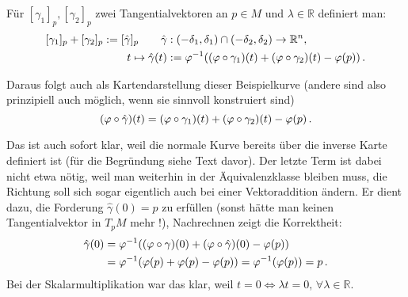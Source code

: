 \documentclass[../H_Analysis_main.tex]{subfiles}
\begin{document}
\begin{itemize}
\begin{defi}[Addition]
Für $[\gamma_1]_p, [\gamma_2]_p$ zwei Tangentialvektoren an $p \in M$ und $\lambda \in \mathbb{R}$ definiert man:
\begin{equation}
\begin{split}
[\gamma_1]_p + [\gamma_2]_p := [\hat{\gamma}]_p \qquad \hat{\gamma}&: (-\delta_1, \delta_1) \cap (-\delta_2, \delta_2) \rightarrow \mathbb{R}^n,
\\
t \mapsto \hat{\gamma}(t) &:= \varphi^{-1}\qty(\qty(\varphi \circ \gamma_1)(t) + \qty(\varphi \circ \gamma_2)(t) - \varphi(p)) \, .
\end{split}
\end{equation}
\end{defi}

Daraus folgt auch als Kartendarstellung dieser Beispielkurve (andere sind also prinzipiell auch möglich, wenn sie sinnvoll konstruiert sind)
\begin{equation*}
\qty(\varphi \circ \hat{\gamma})(t) = \qty(\varphi \circ \gamma_1)(t) + \qty(\varphi \circ \gamma_2)(t) - \varphi(p) \, .
\end{equation*}

Das ist auch sofort klar, weil die normale Kurve bereits über die inverse Karte definiert ist (für die Begründung siehe Text davor).
Der letzte Term ist dabei nicht etwa nötig, weil man weiterhin in der Äquivalenzklasse bleiben muss, die Richtung soll sich sogar eigentlich auch bei einer Vektoraddition ändern. Er dient dazu, die Forderung $\hat{\gamma}(0) = p$ zu erfüllen (sonst hätte man keinen Tangentialvektor in $T_p M$ mehr !), Nachrechnen zeigt die Korrektheit:
\begin{align*}
\hat{\gamma}(0) &= \varphi^{-1}\qty(\qty(\varphi \circ \gamma)(0) + \qty(\varphi \circ \hat{\gamma})(0) - \varphi(p))
\\
&= \varphi^{-1}\qty(\varphi(p) + \varphi(p) - \varphi(p)) = \varphi^{-1}\qty(\varphi(p)) = p \, .
\end{align*}
Bei der Skalarmultiplikation war das klar, weil $t = 0 \Leftrightarrow \lambda t = 0, \, \forall \lambda \in \mathbb{R}$.
\end{itemize}
\end{document}
